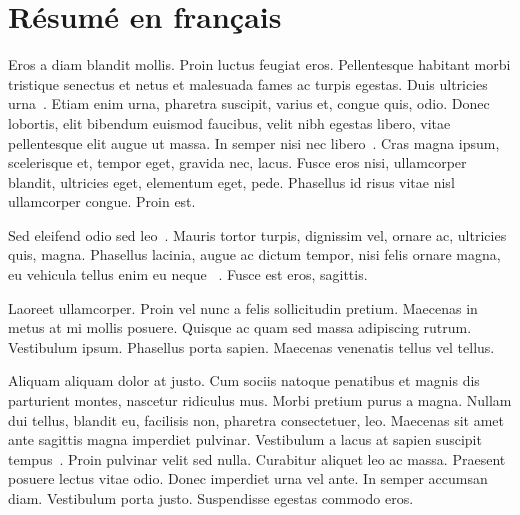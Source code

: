 \clearpage
\chapter*{Résumé en français}

Eros a diam blandit mollis. Proin luctus feugiat eros. Pellentesque habitant
morbi tristique senectus et netus et malesuada fames ac turpis egestas. Duis
ultricies urna~\cite{DBLP:conf/time/Fournier-Sniehotta16,
DBLP:conf/ismir/Fournier-Sniehotta16, FRT17-InfoSystems}. Etiam enim urna,
pharetra suscipit, varius et, congue quis, odio. Donec lobortis, elit bibendum
euismod faucibus, velit nibh egestas libero, vitae pellentesque elit augue ut
massa.
%
In semper nisi nec libero~\cite{bdcc6010023, ismirLBD22-Zhu}.
Cras magna ipsum, scelerisque et, tempor eget, gravida nec, lacus. Fusce eros
nisi, ullamcorper blandit, ultricies eget, elementum eget, pede. Phasellus id
risus vitae nisl ullamcorper congue. Proin est.

Sed eleifend odio sed
leo~\cite{foscarin:hal-02267454,FJF19b,foscarin:hal-01791404}. Mauris tortor
turpis, dignissim vel, ornare ac, ultricies quis, magna. Phasellus lacinia,
augue ac dictum tempor, nisi felis ornare magna, eu vehicula tellus enim eu
neque~\cite{foscarin:hal-03300102} . Fusce est eros, sagittis.

\medskip

Laoreet ullamcorper. Proin vel nunc a felis sollicitudin pretium. Maecenas in
metus at mi mollis posuere. Quisque ac quam sed massa adipiscing rutrum.
Vestibulum ipsum. Phasellus porta sapien. Maecenas venenatis tellus vel tellus.

Aliquam aliquam dolor at justo. Cum sociis natoque penatibus et magnis dis
parturient montes, nascetur ridiculus mus. Morbi pretium purus a magna. Nullam
dui tellus, blandit eu, facilisis non, pharetra consectetuer, leo. Maecenas sit
amet ante sagittis magna imperdiet pulvinar. Vestibulum a lacus at sapien
suscipit tempus~\cite{ramaciottimorales:hal-03098374,morales:hal-02999863}.
Proin pulvinar velit sed nulla. Curabitur aliquet leo ac massa. Praesent posuere
lectus vitae odio. Donec imperdiet urna vel ante. In semper accumsan diam.
Vestibulum porta justo. Suspendisse egestas commodo eros.

